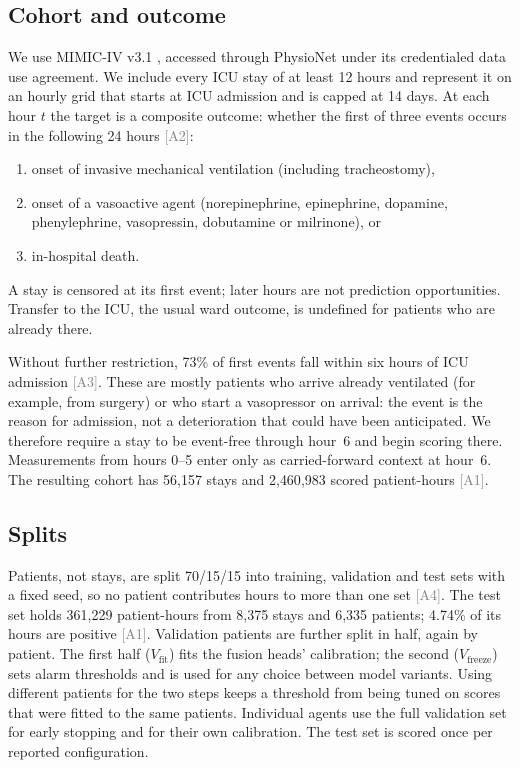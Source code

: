 \documentclass[11pt]{article}
\newcommand{\ev}[1]{\textcolor{gray}{\scriptsize[#1]}}   %
\begin{document}
\subsection{Cohort and outcome}
We use MIMIC-IV v3.1 \cite{johnson2023mimiciv}, accessed through PhysioNet
under its credentialed data use agreement. We include every ICU stay of at
least 12 hours and represent it on an hourly grid that starts at ICU
admission and is capped at 14 days. At each hour $t$ the target is a
composite outcome: whether the first of three events occurs in the following
24 hours \ev{A2}:
\begin{enumerate}
  \item onset of invasive mechanical ventilation (including tracheostomy),
  \item onset of a vasoactive agent (norepinephrine, epinephrine, dopamine,
        phenylephrine, vasopressin, dobutamine or milrinone), or
  \item in-hospital death.
\end{enumerate}
A stay is censored at its first event; later hours are not prediction
opportunities. Transfer to the ICU, the usual ward outcome, is undefined for
patients who are already there.

Without further restriction, 73\% of first events fall within six hours of
ICU admission \ev{A3}. These are mostly patients who arrive already ventilated
(for example, from surgery) or who start a vasopressor on arrival: the event
is the reason for admission, not a deterioration that could have been
anticipated. We therefore require a stay to be event-free through hour~6 and
begin scoring there. Measurements from hours 0--5 enter only as
carried-forward context at hour~6. The resulting cohort has 56{,}157 stays and
2{,}460{,}983 scored patient-hours \ev{A1}.

\subsection{Splits}
Patients, not stays, are split 70/15/15 into training, validation and test
sets with a fixed seed, so no patient contributes hours to more than one set
\ev{A4}. The test set holds 361{,}229 patient-hours from 8{,}375 stays and
6{,}335 patients; 4.74\% of its hours are positive \ev{A1}. Validation
patients are further split in half, again by patient. The first half
($V_{\text{fit}}$) fits the fusion heads' calibration; the second
($V_{\text{freeze}}$) sets alarm thresholds and is used for any choice between
model variants. Using different patients for the two steps keeps a threshold
from being tuned on scores that were fitted to the same patients.
Individual agents use the full validation set for early stopping and for their
own calibration. The test set is scored once per reported configuration.
\end{document}

